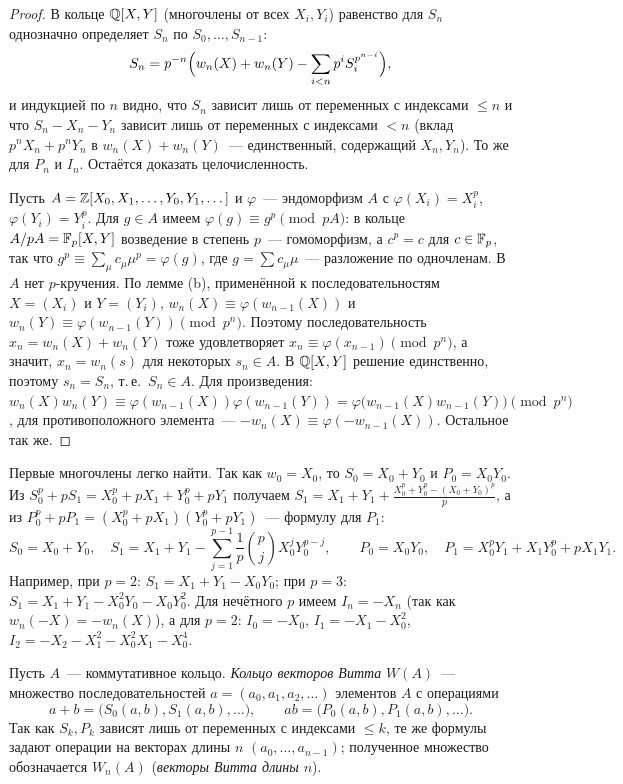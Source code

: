 \begin{proof}
В кольце $\mathbb Q[X,Y]$ (многочлены от всех $X_i,Y_i$) равенство для $S_n$ однозначно определяет $S_n$ по $S_0,\dots,S_{n-1}$:
\[
S_n=p^{-n}\Bigl(w_n(X)+w_n(Y)-\sum_{i<n}p^iS_i^{p^{n-i}}\Bigr),
\]
и индукцией по $n$ видно, что $S_n$ зависит лишь от переменных с индексами $\le n$ и что $S_n-X_n-Y_n$ зависит лишь от
переменных с индексами $<n$ (вклад $p^nX_n+p^nY_n$ в $w_n(X)+w_n(Y)$~--- единственный, содержащий $X_n,Y_n$). То же для
$P_n$ и $I_n$. Остаётся доказать целочисленность.

Пусть $A=\mathbb Z[X_0,X_1,\dots,Y_0,Y_1,\dots]$ и $\varphi$~--- эндоморфизм $A$ с $\varphi(X_i)=X_i^p$, $\varphi(Y_i)=Y_i^p$. Для
$g\in A$ имеем $\varphi(g)\equiv g^p\pmod{pA}$: в кольце $A/pA=\mathbb F_p[X,Y]$ возведение в степень $p$~--- гомоморфизм, а
$c^p=c$ для $c\in\mathbb F_p$, так что $g^p\equiv\sum_\mu c_\mu\mu^p=\varphi(g)$, где $g=\sum c_\mu\mu$~--- разложение по одночленам.
В $A$ нет $p$-кручения. По лемме (b), применённой к последовательностям $X=(X_i)$ и $Y=(Y_i)$,
$w_n(X)\equiv\varphi(w_{n-1}(X))$ и $w_n(Y)\equiv\varphi(w_{n-1}(Y))\pmod{p^n}$. Поэтому последовательность
$x_n=w_n(X)+w_n(Y)$ тоже удовлетворяет $x_n\equiv\varphi(x_{n-1})\pmod{p^n}$, а значит, $x_n=w_n(s)$ для некоторых
$s_n\in A$. В $\mathbb Q[X,Y]$ решение единственно, поэтому $s_n=S_n$, т.\,е.\ $S_n\in A$. Для произведения:
$w_n(X)w_n(Y)\equiv\varphi(w_{n-1}(X))\varphi(w_{n-1}(Y))=\varphi\bigl(w_{n-1}(X)w_{n-1}(Y)\bigr)\pmod{p^n}$, для
противоположного элемента~--- $-w_n(X)\equiv\varphi(-w_{n-1}(X))$. Остальное так же.
\end{proof}

Первые многочлены легко найти. Так как $w_0=X_0$, то $S_0=X_0+Y_0$ и $P_0=X_0Y_0$. Из
$S_0^p+pS_1=X_0^p+pX_1+Y_0^p+pY_1$ получаем $S_1=X_1+Y_1+\frac{X_0^p+Y_0^p-(X_0+Y_0)^p}{p}$, а из
$P_0^p+pP_1=(X_0^p+pX_1)(Y_0^p+pY_1)$~--- формулу для $P_1$:
\[
S_0=X_0+Y_0,\quad S_1=X_1+Y_1-\sum_{j=1}^{p-1}\frac1p\binom pjX_0^jY_0^{p-j},\qquad P_0=X_0Y_0,\quad
P_1=X_0^pY_1+X_1Y_0^p+pX_1Y_1.
\]
Например, при $p=2$: $S_1=X_1+Y_1-X_0Y_0$; при $p=3$: $S_1=X_1+Y_1-X_0^2Y_0-X_0Y_0^2$. Для нечётного $p$ имеем
$I_n=-X_n$ (так как $w_n(-X)=-w_n(X)$), а для $p=2$: $I_0=-X_0$, $I_1=-X_1-X_0^2$, $I_2=-X_2-X_1^2-X_0^2X_1-X_0^4$.

\begin{definition}[5.32m]
Пусть $A$~--- коммутативное кольцо. \emph{Кольцо векторов Витта} $W(A)$~--- множество последовательностей
$a=(a_0,a_1,a_2,\dots)$ элементов $A$ с операциями
\[
a+b=\bigl(S_0(a,b),S_1(a,b),\dots\bigr),\qquad ab=\bigl(P_0(a,b),P_1(a,b),\dots\bigr).
\]
Так как $S_k,P_k$ зависят лишь от переменных с индексами $\le k$, те же формулы задают операции на векторах длины $n$
$(a_0,\dots,a_{n-1})$; полученное множество обозначается $W_n(A)$ (\emph{векторы Витта длины $n$}).
\end{definition}

